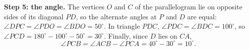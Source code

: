 \textbf{Step 5: the angle.} The vertices $O$ and $C$ of the parallelogram lie on opposite sides of its diagonal $PD$, so the alternate angles at $P$ and $D$ are equal: $\angle DPC=\angle PDO=\angle BDO=50^\circ$. In triangle $PDC$, $\angle PDC=\angle BDC=100^\circ$, so $\angle PCD=180^\circ-100^\circ-50^\circ=30^\circ$. Finally, since $D$ lies on $CA$,
\[\angle PCB=\angle ACB-\angle PCA=40^\circ-30^\circ=\boxed{10^\circ}.\]
